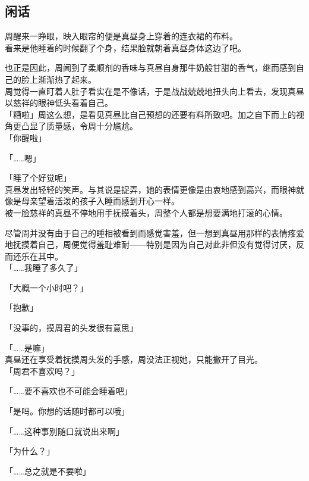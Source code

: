 \subsection{闲话}

周醒来一睁眼，映入眼帘的便是真昼身上穿着的连衣裙的布料。\\

看来是他睡着的时候翻了个身，结果脸就朝着真昼身体这边了吧。

也正是因此，周闻到了柔顺剂的香味与真昼自身那牛奶般甘甜的香气，继而感到自己的脸上渐渐热了起来。\\

周觉得一直盯着人肚子看实在是不像话，于是战战兢兢地扭头向上看去，发现真昼以慈祥的眼神低头看着自己。\\

「糟啦」周这么想，是看见真昼比自己预想的还要有料所致吧。加之自下而上的视角更凸显了质量感，令周十分尴尬。\\

「你醒啦」

「……嗯」

「睡了个好觉呢」\\

真昼发出轻轻的笑声。与其说是捉弄，她的表情更像是由衷地感到高兴，而眼神就像是母亲望着活泼的孩子入睡而感到开心一样。\\

被一脸慈祥的真昼不停地用手抚摸着头，周整个人都是想要满地打滚的心情。

尽管周并没有由于自己的睡相被看到而感觉害羞，但一想到真昼用那样的表情疼爱地抚摸着自己，周便觉得羞耻难耐——特别是因为自己对此非但没有觉得讨厌，反而还乐在其中。\\

「……我睡了多久了」

「大概一个小时吧？」

「抱歉」

「没事的，摸周君的头发很有意思」

「……是嘛」\\

真昼还在享受着抚摸周头发的手感，周没法正视她，只能撇开了目光。\\

「周君不喜欢吗？」

「……要不喜欢也不可能会睡着吧」

「是吗。你想的话随时都可以哦」

「……这种事别随口就说出来啊」

「为什么？」

「……总之就是不要啦」\\

